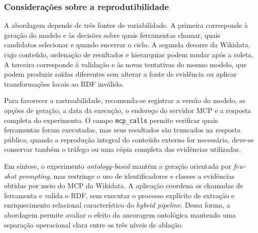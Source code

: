 \subsubsection{Considerações sobre a reprodutibilidade}

A abordagem depende de três fontes de variabilidade. A primeira corresponde à
geração do modelo e às decisões sobre quais ferramentas chamar, quais
candidatos selecionar e quando encerrar o ciclo. A segunda decorre da Wikidata,
cujo conteúdo, ordenação de resultados e hierarquias podem mudar após a coleta.
A terceira corresponde à validação e às novas tentativas do mesmo modelo, que
podem produzir saídas diferentes sem alterar a fonte de evidência ou aplicar
transformações locais ao RDF inválido.

Para favorecer a rastreabilidade, recomenda-se registrar a versão do modelo,
as opções de geração, a data da execução, o endereço do servidor MCP e a
resposta completa do experimento. O campo \texttt{mcp\_calls} permite verificar
quais ferramentas foram executadas, mas seus resultados são truncados na
resposta pública; quando a reprodução integral do conteúdo externo for
necessária, deve-se conservar também o tráfego ou uma cópia completa das
evidências utilizadas.

Em síntese, o experimento \textit{ontology-based} mantém a geração orientada por
\textit{few-shot prompting}, mas restringe o uso de identificadores e classes a
evidências obtidas por meio do MCP da Wikidata. A aplicação coordena as chamadas
de ferramenta e valida o RDF, sem executar o processo explícito de extração e
enriquecimento relacional característico do \textit{hybrid pipeline}. Dessa
forma, a abordagem permite avaliar o efeito da ancoragem ontológica mantendo
uma separação operacional clara entre os três níveis de ablação.
